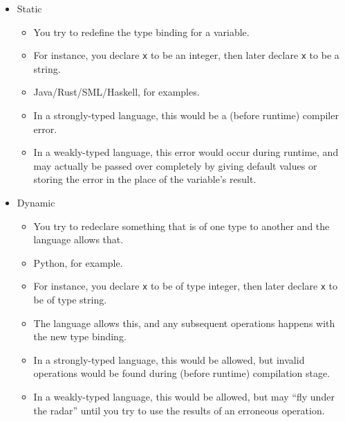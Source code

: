 \begin{itemize}
\item Static
  \begin{itemize}[noitemsep]
  \item You try to redefine the type binding for a variable.
  \item For instance, you declare \texttt{x} to be an integer, then later declare \texttt{x} to be a string.
  \item Java/Rust/SML/Haskell, for examples.
  \item In a strongly-typed language, this would be a (before runtime) compiler error.
  \item In a weakly-typed language, this error would occur during runtime, and may actually be passed over completely by giving default values or storing the error in the place of the variable's result.
  \end{itemize}

\item Dynamic
  \begin{itemize}[noitemsep]
  \item You try to redeclare something that is of one type to another and the language allows that.
  \item Python, for example.
  \item For instance, you declare \texttt{x} to be of type integer, then later declare \texttt{x} to be of type string.
  \item The language allows this, and any subsequent operations happens with the new type binding.
  \item In a strongly-typed language, this would be allowed, but invalid operations would be found during (before runtime) compilation stage.
  \item In a weakly-typed language, this would be allowed, but may ``fly under the radar'' until you try to use the results of an erroneous operation.
  \end{itemize}
\end{itemize}

